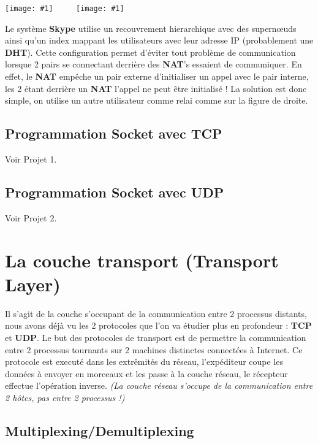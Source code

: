 \documentclass{article}
\newcommand{\imageRT}[2]{\texttt{[image: \#1]}}
\begin{document}
\imageRT{CN_025.png}{150} $\ \ \ \ \ \ \ \ \ $  \imageRT{CN_026.png}{200}

Le système \textbf{Skype} utilise un recouvrement hierarchique avec des supern\oe uds ainsi qu'un index mappant 
les utilisateurs avec leur adresse IP (probablement une \textbf{DHT}). Cette configuration permet d'éviter tout
problème de communication lorsque 2 pairs se connectant derrière des \textbf{NAT}'s essaient de communiquer. En
effet, le \textbf{NAT} empêche un pair externe d'initialiser un appel avec le pair interne, les 2 étant derrière
un \textbf{NAT} l'appel ne peut être initialisé ! La solution est donc simple, on utilise un autre utilisateur
comme relai comme sur la figure de droite.

\subsection{Programmation Socket avec TCP}

Voir Projet 1.

\subsection{Programmation Socket avec UDP}

Voir Projet 2. \\

\hbox{\raisebox{0.4em}{\vrule depth 0.4pt height 0.4pt width 10cm}}

\section{La couche transport (Transport Layer)}

Il s'agit de la couche s'occupant de la communication entre 2 processus distants, nous avons déjà vu les 2 
protocoles que l'on va étudier plus en profondeur : \textbf{TCP} et \textbf{UDP}. Le but des protocoles de 
transport est de permettre la communication entre 2 processus tournants sur 2 machines distinctes connectées à
Internet. Ce protocole est executé dans les extrêmités du réseau, l'expéditeur coupe les données à envoyer en
morceaux et les passe à la couche réseau, le récepteur effectue l'opération inverse. \textit{(La couche réseau 
s'occupe de la communication entre 2 hôtes, pas entre 2 processus !)}

\subsection{Multiplexing/Demultiplexing}
\end{document}
